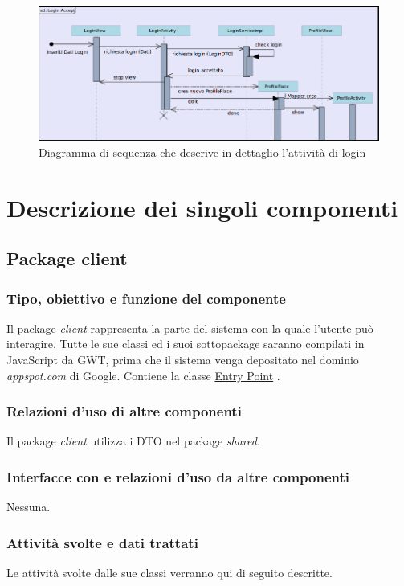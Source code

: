 \begin{figure}[h]
  \centering
  \includegraphics[width=16.5cm]{img/ST/seq-login.png}
\caption{Diagramma di sequenza che descrive in dettaglio l'attivit\`a di login}
\end{figure}


\chapter{Descrizione dei singoli componenti}
\section{Package client}
\subsection*{Tipo, obiettivo e funzione del componente} %
Il package \emph{client} rappresenta la parte del sistema con la quale l'utente
pu\`o interagire. Tutte le sue classi ed i suoi sottopackage saranno compilati in
JavaScript da GWT, prima che il sistema venga depositato nel dominio
\emph{appspot.com} di Google. Contiene la classe \underline{Entry Point}
.

\subsection*{Relazioni d'uso di altre componenti}
Il package \emph{client} utilizza i DTO nel package \emph{shared}.

\subsection*{Interfacce con e relazioni d'uso da altre componenti}
Nessuna.

\subsection*{Attivit\`a svolte e dati trattati}
Le attivit\`a svolte dalle sue classi verranno qui di seguito descritte.

